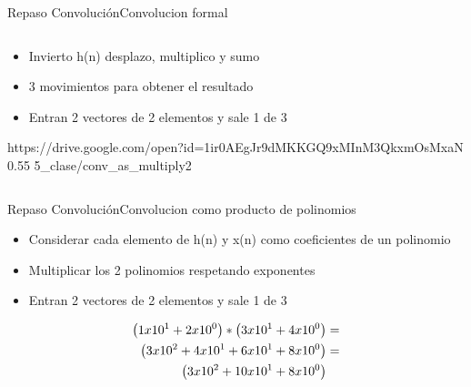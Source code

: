 \begin{frame}{Repaso Convolución}{Convolucion formal}
\begin{columns}[t]
      \hspace{2pt}
      \vrule
      \hspace{2pt}
      \begin{column}{0.6\textwidth}
      \tiny
      \begin{itemize}
         \item{Invierto h(n) desplazo, multiplico y sumo}
         \item{3 movimientos para obtener el resultado}
         \item{Entran 2 vectores de 2 elementos y sale 1 de 3}
      \end{itemize}
         {https://drive.google.com/open?id=1ir0AEgJr9dMKKGQ9xMInM3QkxmOsMxaN}
         {0.55}
         {5_clase/conv_as_multiply2}
      \end{column}
   \end{columns}
   \vfill
\end{frame}
\begin{frame}{Repaso Convolución}{Convolucion como producto de polinomios}
   \begin{itemize}
      \item{Considerar cada elemento de h(n) y x(n) como coeficientes de un polinomio}
      \item{Multiplicar los 2 polinomios respetando exponentes}
      \item{Entran 2 vectores de 2 elementos y sale 1 de 3}
   \end{itemize}
   \begin{align*}
      \large
      \left( 1 x10^1 + 2 x10^0 \right) * \left( 3 x10^1 + 4 x10^0 \right) &=  \\
      \left( 3 x10^2 + 4 x10^1 + 6 x10^1 + 8 x10^0\right) &=  \\
      \left( 3 x10^2 + 10 x10^1 + 8 x10^0\right)\\
   \end{align*}
   \vfill
\end{frame}
